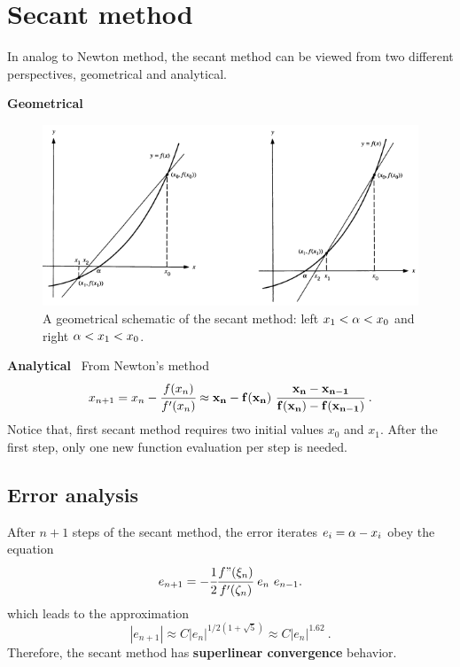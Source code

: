 \documentclass[12pt]{article}
\theoremstyle{theorem}
\begin{document}
\cleardoublepage

\section{Secant method}

In analog to Newton method, the secant method can be viewed from two different perspectives, geometrical and analytical.

\textbf{Geometrical}
\begin{figure}[h!]
	\centering
	\includegraphics[scale = 0.8]{Figures/11}
	\caption{A geometrical schematic of the secant method: left $x_1<\alpha< x_0$ and right $\alpha<x_1<x_0$.}
	\label{fig:11}
\end{figure}

\textbf{Analytical} \ From Newton's method
%
\begin{equation*}
 x_{n+1} = x_n - \cfrac{f(x_n)}{f'(x_n)} \ \mathbf{\approx x_n - f(x_n) \ \cfrac{x_n-x_{n-1}}{f(x_n)-f(x_{n-1})} } \ .
\end{equation*}
%
Notice that, first secant method requires two initial values $x_0$ and $x_1$. After the first step, only one new function evaluation per step is needed.

\subsection{Error analysis}
After $n+1$ steps of the secant method, the error iterates $e_i = \alpha - x_i$ obey the equation
%
\begin{equation*}
e_{n+1} = - \cfrac{1}{2} \cfrac{f"(\xi_n)}{f'(\zeta_n)} \ e_{n} \ e_{n-1}.
\end{equation*}
%
which leads to the approximation
%
\begin{equation*}
 |e_{n+1}| \approx C|e_n|^{1/2(1+\sqrt{5})} \approx C|e_n|^{1.62} \ .
\end{equation*}
%
Therefore, the secant method has \textbf{superlinear convergence} behavior.
\end{document}
